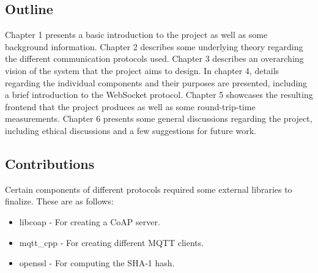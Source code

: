 \iffalse
Examples: “The study has its focus on…. In the survey, the effect of parameter Z is ignored, because…. The survey is distinguished by the evaluation of cases F1 and F2…. The survey's conclusions should however be generally valid for every….”
\fi

\subsection{Outline}
\label{ch:intro:outline}
Chapter 1 presents a basic introduction to the project as well as some background information. Chapter 2 describes some underlying theory regarding the different communication protocols used. Chapter 3 describes an overarching vision of the system that the project aims to design. In chapter 4, details regarding the individual components and their purposes are presented, including a brief introduction to the WebSocket protocol. Chapter 5 showcases the resulting frontend that the project produces as well as some round-trip-time measurements. Chapter 6 presents some general discussions regarding the project, including ethical discussions and a few suggestions for future work.

\subsection{Contributions}
\label{ch:intro:contributions}

Certain components of different protocols required some external libraries to finalize. These are as follows:

\begin{itemize}
	\item libcoap\cite{libcoap} - For creating a CoAP server.
	\item mqtt\_cpp\cite{mqttcpp} - For creating different MQTT clients.
	\item openssl\cite{openssl} - For computing the SHA-1 hash.
\end{itemize}
